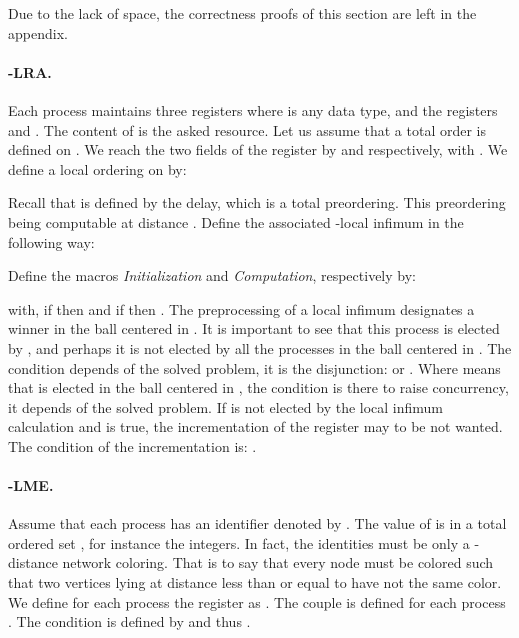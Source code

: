\documentclass[11pt]{article}
\begin{document}
Due to the lack of space, the correctness proofs of this section are left in the appendix.

\paragraph{-LRA.}

Each process  maintains three registers  where  is
any data type, and the registers  and . The
content of  is the asked resource. Let us assume that a total order  is defined on . 
We reach the two fields of the register  by  and  respectively, with .  
We define a local ordering on  by:
\begin{center}

\end{center}
Recall that  is defined by the delay, which is a total preordering. This preordering being computable at distance .    
Define the associated -local infimum in the following way:
\begin{center}
\end{center}

Define the macros \emph{Initialization} and \emph{Computation}, respectively by:
\begin{center}

\end{center}
with, if  then  and if  then . 
The preprocessing of a local infimum designates a winner  in the ball centered in . It is important to see that this process is elected
by , and perhaps it is not elected by all the processes in the  ball centered in .  
The condition  depends of the solved problem, it is the disjunction:   or  . Where   means that  is elected in the  ball centered in , the condition  is there to raise
concurrency, it depends of the solved problem.
If   is not elected by the local infimum calculation and  is true, the incrementation of the register may to be  not 
wanted. The condition  of the incrementation is: .



\paragraph{-LME.}

Assume that each process  has an identifier denoted by . The
value of  is in a total ordered set , for instance the
integers. In fact, the identities must be only a -distance
network coloring. That is to say that every node must be colored
such that two vertices lying at distance less than or equal to 
have not the same color.
We define for each process  the register  as . 
The couple  is defined for each process . The condition  is defined by  and thus .
\end{document}
